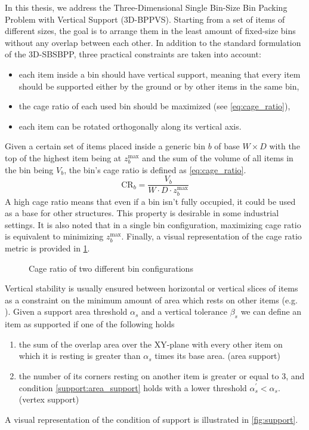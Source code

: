 In this thesis, we address the Three-Dimensional Single Bin-Size Bin Packing Problem with Vertical Support (3D-BPPVS).
Starting from a set of items of different sizes, the goal is to arrange them in the least amount of fixed-size bins without any overlap between each other.
In addition to the standard formulation of the 3D-SBSBPP, three practical constraints are taken into account:
\begin{itemize}
    \item each item inside a bin should have vertical support, meaning that every item should be supported either by the ground or by other items in the same bin,
    \item the cage ratio of each used bin should be maximized (see \cref{eq:cage_ratio}),
    \item each item can be rotated orthogonally along its vertical axis.
\end{itemize}

Given a certain set of items placed inside a generic bin $b$ of base $W \times D$ with the top of the highest item being at $z_b^\text{max}$ and the sum of the volume of all items in the bin being $V_b$, the bin's cage ratio is defined as \cref{eq:cage_ratio}.
\begin{equation}
    \label{eq:cage_ratio}
    \text{CR}_b = \frac{V_b}{W \cdot D \cdot z_b^\text{max}}
\end{equation}
A high cage ratio means that even if a bin isn't fully occupied, it could be used as a base for other structures. This property is desirable in some industrial settings.
It is also noted that in a single bin configuration, maximizing cage ratio is equivalent to minimizing $z_b^\text{max}$. Finally, a visual representation of the cage ratio metric is provided in \cref{fig:cage_ratio}.

\begin{figure}[H]
    \scalebox{0.60}{%
    
    }
    \caption{Cage ratio of two different bin configurations}
    \label{fig:cage_ratio}
\end{figure}

Vertical stability is usually ensured between horizontal or vertical slices of items as a constraint on the minimum amount of area which rests on other items (e.g. \cite{GZARA20201062,kurpel2020exact,paquay2016mixed}).
Given a support area threshold $\alpha_s$ and a vertical tolerance $\beta_s$ we can define an item as supported if one of the following holds
\begin{enumerate}
    \item the sum of the overlap area over the XY-plane with every other item on which it is resting is greater than $\alpha_s$ times its base area. (area support) \label{support:area_support}
    \item the number of its corners resting on another item is greater or equal to 3, and condition \ref{support:area_support} holds with a lower threshold $\alpha^\prime_s < \alpha_s$. (vertex support) \label{support:vertex_support}
\end{enumerate}
A visual representation of the condition of support is illustrated in \cref{fig:support}.

